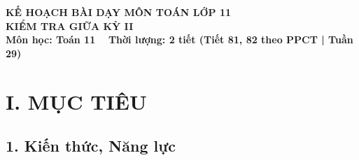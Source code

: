 \documentclass[12pt, a4paper]{article}
\begin{document}
\begin{center}
    {\fontsize{14pt}{17pt}\selectfont \textbf{KẾ HOẠCH BÀI DẠY MÔN TOÁN LỚP 11}}\\[6pt]
    {\fontsize{16pt}{19pt}\selectfont \textbf{KIỂM TRA GIỮA KỲ II}}\\[4pt]
    {\fontsize{12pt}{15pt}\selectfont \textbf{Môn học: Toán 11} \ \textbar \ \textbf{Thời lượng: 2 tiết (Tiết 81, 82 theo PPCT | Tuần 29)}}
\end{center}

\vspace{5pt}

\section*{I. MỤC TIÊU}

\subsection*{1. Kiến thức, Năng lực}
\end{document}
